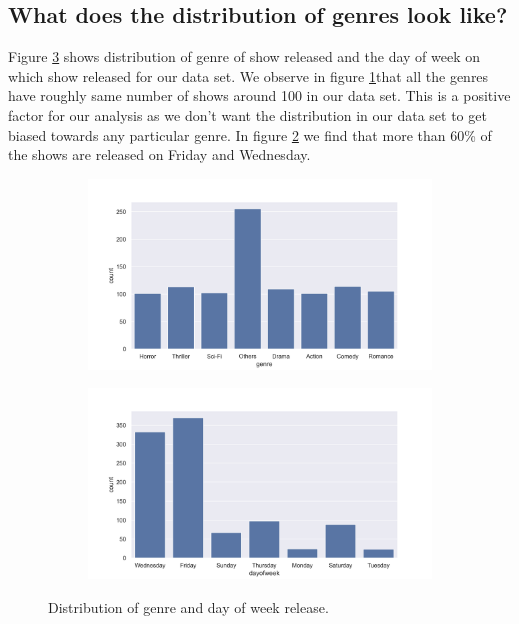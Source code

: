 \documentclass[12pt,a4paper]{style}
\begin{document}
\subsection{What does the distribution of genres look like?}
Figure \ref{fig:genre and day dist} shows distribution of genre of show released and the day of week on which show released for our data set. We observe in figure \ref{fig:genre dist}that all the genres have roughly same number of shows around 100 in our data set. This is a positive factor for our analysis as we don't want the distribution in our data set to get biased towards any particular genre. In figure \ref{fig:dayofweek dist} we find that more than 60\% of the shows are released on Friday and Wednesday. 
\begin{figure}[h]
	\centering
	\begin{subfigure}[t]{0.49\textwidth}
		\includegraphics[width=\textwidth]{genre_dist.png}
		\caption{}
		\label{fig:genre dist}
	\end{subfigure}
	\hfill
	\begin{subfigure}[t]{0.49\textwidth}
		\includegraphics[width=\textwidth]{dayofweek.png}
		\caption{}
		\label{fig:dayofweek dist}
	\end{subfigure}
	\caption{Distribution of genre and day of week release.}
	\label{fig:genre and day dist}
\end{figure}
\end{document}
